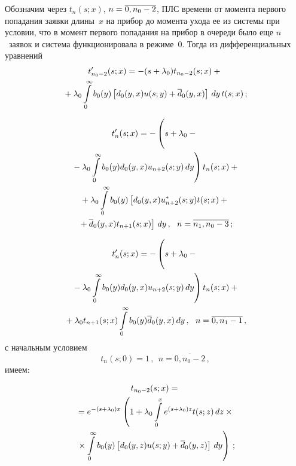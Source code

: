 \begin{multicols}{2}
Обозначим через $t_n(s;x)$, $n\hm=\overline{0,n_0-2}$,
ПЛС времени от момента первого попадания заявки длины~$x$
на прибор до момента ухода ее из системы при условии,
что в момент первого попадания на прибор в очереди
было еще $n$~заявок и система функционировала в режиме~0.
Тогда из дифференциальных уравнений
\begin{multline*}
t'_{n_0-2}(s;x) = - (s + \lambda_0) t_{n_0-2}(s;x) +{}\\
{}+
\lambda_0 \int\limits_0^\infty b_0(y) \left[d_0(y,x) u(s;y) + \overline d_0(y,x)\right] \, dy\, t(s;x)\,;
\end{multline*}

\vspace*{-12pt}

\noindent
\begin{multline*}
t'_n(s;x) = -\left( \vphantom{\int\limits_0^\infty}
s + \lambda_0 - {}\right.\\
\left.{}-\lambda_0 \int\limits_0^\infty b_0(y) d_0(y,x) u_{n+2}(s;y) \, dy
\right)
t_n(s;x) +{}
\\
{}+
\lambda_0 \int\limits_0^\infty b_0(y) \left[d_0(y,x) u_{n+2}^*(s;y) t(s;x) +{}\right.\\
\left.{}+
\overline d_0(y,x) t_{n+1}(s;x)\right] \, dy\,,
\ \ n=\overline{n_1,n_0-3}\,;
\end{multline*}

\vspace*{-12pt}

\noindent
\begin{multline*}
t'_n(s;x)= - \left( \vphantom{\int\limits_0^\infty}
s + \lambda_0 - {}\right.\\
\left.{}-\lambda_0 \int\limits_0^\infty b_0(y) d_0(y,x) u_{n+2}(s;y)\, dy
\right) t_n(s;x) +{}
\\
{}+
\lambda_0 t_{n+1}(s;x) \int\limits_0^\infty b_0(y) \overline d_0(y,x) \, dy\,,
\ \ n=\overline{0,n_1-1}\,,
\end{multline*}
с начальным условием
$$
t_{n}(s;0)= 1\,,\ \ n=\overline{0,n_0-2}\,,
$$
имеем:

\noindent
\begin{multline}
\label{5-4-1-m}
t_{n_0-2}(s;x)= {}\\
{}=e^{-(s + \lambda_0) x}\left(
1+ \lambda_0 \int\limits_0^x e^{(s + \lambda_0) z} t(s;z)\, dz\times{}\right.\\
\left.{}\times
\int\limits_0^\infty b_0(y) \left[d_0(y,z) u(s;y) + \overline d_0(y,z)\right] \, dy
\right)\,;
\end{multline}


\end{multicols}
